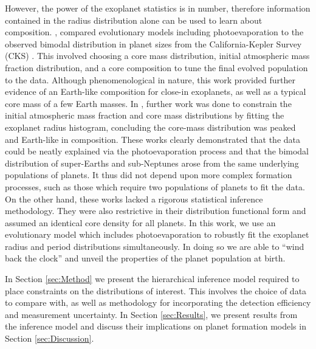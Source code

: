 \documentclass[fleqn,usenatbib]{mnras}
\begin{document}
However, the power of the exoplanet statistics is in number, therefore information contained in the radius distribution alone can be used to learn about composition.  \citet{Owen2017}, compared evolutionary models including photoevaporation to the observed bimodal distribution in planet sizes from the California-Kepler Survey (CKS) \citep{Fulton2017}. This involved choosing a core mass distribution, initial atmospheric mass fraction distribution, and a core composition to tune the final evolved population to the data. Although phenomenological in nature, this work provided further evidence of an Earth-like composition for close-in exoplanets, as well as a typical core mass of a few Earth masses. In \cite{Wu2019}, further work was done to constrain the initial atmospheric mass fraction and core mass distributions by fitting the exoplanet radius histogram, concluding the core-mass distribution was peaked and Earth-like in composition. These works clearly demonstrated that the data could be neatly explained via the photoevaporation process and that the bimodal distribution of super-Earths and sub-Neptunes arose from the same underlying populations of planets. It thus did not depend upon more complex formation processes, such as those which require two populations of planets to fit the data. On the other hand, these works lacked a rigorous statistical inference methodology. They were also restrictive in their distribution functional form and assumed an identical core density for all planets. In this work, we use an evolutionary model which includes photoevaporation to robustly fit the exoplanet radius and period distributions simultaneously. In doing so we are able to ``wind back the clock'' and unveil the properties of the planet population at birth. 

In Section \ref{sec:Method} we present the hierarchical inference model required to place constraints on the distributions of interest. This involves the choice of data to compare with, as well as methodology for incorporating the detection efficiency and measurement uncertainty. In Section \ref{sec:Results}, we present results from the inference model and discuss their implications on planet formation models in Section \ref{sec:Discussion}.
\end{document}
